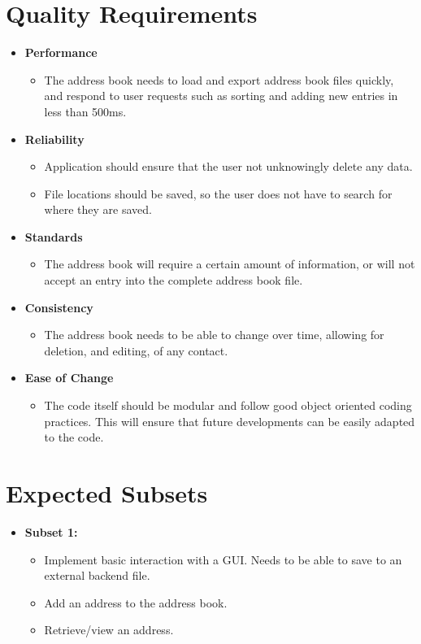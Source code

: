 \documentclass[a4paper, 11pt]{article}
\begin{document}
\section{Quality Requirements}
\begin{itemize}
	\item \textbf{Performance}
	\begin{itemize}
		\item The address book needs to load and export address book files quickly, and respond to user requests such as sorting and adding new entries in less than 500ms.
	\end{itemize}
	\item \textbf{Reliability}
	\begin{itemize}
		\item Application should ensure that the user not unknowingly delete any data.
		\item File locations should be saved, so the user does not have to search for where they are saved.
	\end{itemize}
	\item \textbf{Standards}
	\begin{itemize}
		\item The address book will require a certain amount of information, or will not accept an entry into the complete address book file.
	\end{itemize}
		\item \textbf{Consistency}
	\begin{itemize}
		\item The address book needs to be able to change over time, allowing for deletion, and editing, of any contact.
	\end{itemize}
	\item \textbf{Ease of Change}
	\begin{itemize}
	\item The code itself should be modular and follow good object oriented coding practices. This will ensure that future developments can be easily adapted to the code.	
	\end{itemize}

\end{itemize}
\section{Expected Subsets}
\begin{itemize}
	\item \textbf{Subset 1:}
	\begin{itemize}
		\item Implement basic interaction with a GUI. Needs to be able to save to an external backend file.
		\item Add an address to the address book.
		\item Retrieve/view an address.
	\end{itemize}
\end{itemize}
\end{document}

